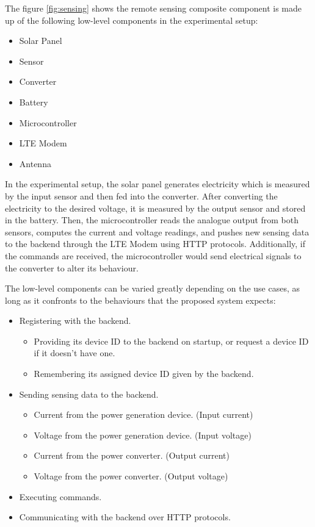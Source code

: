 \documentclass[../thesis.tex]{subfiles}
\begin{document}
The figure \ref{fig:sensing} shows the remote sensing composite component is made up of the following low-level components in the experimental setup:

\begin{itemize}
\item Solar Panel
\item Sensor
\item Converter
\item Battery
\item Microcontroller
\item LTE Modem
\item Antenna
\end{itemize}

In the experimental setup, the solar panel generates electricity which is measured by the input sensor and then fed into the converter. After converting the electricity to the desired voltage, it is measured by the output sensor and stored in the battery. Then, the microcontroller reads the analogue output from both sensors, computes the current and voltage readings, and pushes new sensing data to the backend through the LTE Modem using HTTP protocols. Additionally, if the commands are received, the microcontroller would send electrical signals to the converter to alter its behaviour.

The low-level components can be varied greatly depending on the use cases, as long as it confronts to the behaviours that the proposed system expects:

\begin{itemize}
\item Registering with the backend.
\begin{itemize}
\item Providing its device ID to the backend on startup, or request a device ID if it doesn't have one.
\item Remembering its assigned device ID given by the backend.
\end{itemize}
\item Sending sensing data to the backend.
\begin{itemize}
\item Current from the power generation device. (Input current)
\item Voltage from the power generation device. (Input voltage)
\item Current from the power converter. (Output current)
\item Voltage from the power converter. (Output voltage)
\end{itemize}
\item Executing commands.
\item Communicating with the backend over HTTP protocols.
\end{itemize}
\end{document}
